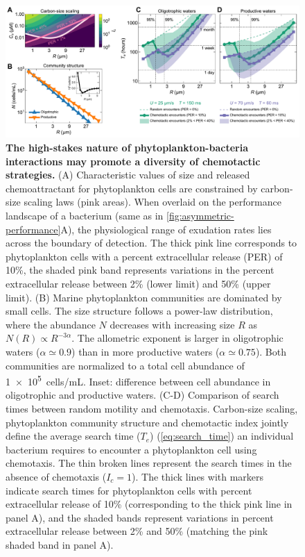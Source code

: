 \documentclass[9pt,twocolumn,twoside]{pnas-new}
\begin{document}
\begin{figure}
    \centering
    \includegraphics[width=17.8cm]{fig5_mod.pdf}
    \caption{
        \textbf{
        The high-stakes nature of phytoplankton-bacteria interactions may promote a diversity of chemotactic strategies.
        }
        (A) Characteristic values of size and released chemoattractant for phytoplankton cells are constrained by carbon-size scaling laws (pink areas). When overlaid on the performance landscape of a bacterium (same as in \autoref{fig:asymmetric-performance}A), the physiological range of exudation rates lies across the boundary of detection.
        The thick pink line corresponds to phytoplankton cells with a percent extracellular release (PER) of 10\%, the shaded pink band represents variations in the percent extracellular release between 2\% (lower limit) and 50\% (upper limit).
        (B) Marine phytoplankton communities are dominated by small cells. The size structure follows a power-law distribution, where the abundance $N$ decreases with increasing size $R$ as $N(R) \propto R^{-3\alpha}$.
        The allometric exponent is larger in oligotrophic waters ($\alpha\simeq 0.9$) than in more productive waters ($\alpha\simeq 0.75$). Both  communities are normalized to a total cell abundance of \SI{1e5}{cells/\milli\liter}.
        Inset: difference between cell abundance in oligotrophic and productive waters.
        (C-D) Comparison of search times between random motility and chemotaxis.
        Carbon-size scaling, phytoplankton community structure and chemotactic index jointly define the average search time ($T_e$) (\autoref{eq:search_time}) an individual bacterium requires to encounter a phytoplankton cell using chemotaxis.
        The thin broken lines represent the search times in the absence of chemotaxis ($I_c=1$).
        The thick lines with markers indicate search times for phytoplankton cells with percent extracellular release of 10\% (corresponding to the thick pink line in panel A), and the shaded bands represent variations in percent extracellular release between 2\% and 50\% (matching the pink shaded band in panel A).
}
\end{figure}
\end{document}
